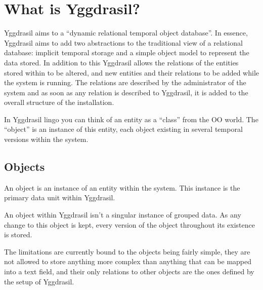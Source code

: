 \documentclass[english,a4paper]{article}
\begin{document}


\tableofcontents

\newpage

\section{What is Yggdrasil?}

Yggdrasil aims to a ``dynamic relational temporal object database''.
In essence, Yggdrasil aims to add two abstractions to the traditional
view of a relational database: implicit temporal storage and a simple
object model to represent the data stored.  In addition to this
Yggdrasil allows the relations of the entities stored within to be
altered, and new entities and their relations to be added while the
system is running.  The relations are described by the administrator
of the system and as soon as any relation is described to Yggdrasil,
it is added to the overall structure of the installation.  

In Yggdrasil lingo you can think of an entity as a ``class'' from the
OO world.  The ``object'' is an instance of this entity, each object
existing in several temporal versions within the system.

\subsection{Objects}

An object is an instance of an entity within the system.  This
instance is the primary data unit within Yggdrasil.


An object within Yggdrasil isn't a singular instance of grouped data.
As any change to this object is kept, every version of the object
throughout its existence is stored.  

The limitations are currently bound to the objects being fairly
simple, they are not allowed to store anything more complex than
anything that can be mapped into a text field, and their only
relations to other objects are the ones defined by the setup of
Yggdrasil.
\end{document}
